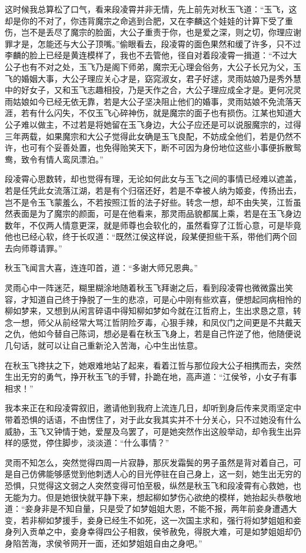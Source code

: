 这时候我总算松了口气，看来段凌霄并非无情，先上前先对秋玉飞道：“玉飞，这却是你的不对了，你违背魔宗之命逃到合肥，又在李麟这个娃娃的计算下受了重伤，岂不是丢尽了魔宗的脸面，大公子重责于你，也是爱之深，则之切，你理应谢罪才是，怎能还与大公子顶嘴。”偷眼看去，段凌霄的面色果然和缓了许多，只不过李麟的脸上已经是黄连模样了，我也不去管他，径自对着段凌霄一揖道：“不过大公子也有不对之处，玉飞乃是阁下师弟，魔宗无心理会俗务，大公子长兄为父，玉飞的婚姻大事，大公子理应关心才是，窈窕淑女，君子好逑，灵雨姑娘乃是秀外慧中的好女子，又和玉飞志趣相投，乃是天作之合，大公子理应成全才是。更何况灵雨姑娘如今已经无依无靠，若是大公子坚决阻止他们的婚事，灵雨姑娘不免流落天涯，若有什么闪失，不仅玉飞心碎神伤，就是魔宗的面子也有损伤。江某也知道大公子难以做主，不过若是将她留在玉飞身边，大公子应还是可以说服魔宗的，过得三年两载，如果魔宗和大公子觉得此女确是玉飞良配，不妨成全他们，若是仍然不许，也可有个妥善处置，也免得贻笑天下，断不可因为身份地位这些小事便拆散鸳鸯，致令有情人鸾凤漂泊。”

段凌霄心思数转，却也觉得有理，无论如何此女与玉飞之间的事情已经难以遮盖，若是任凭此女流落江湖，若是有个归宿还好，若是不幸被人纳为姬妾，传扬出去，岂不是令玉飞蒙羞么，不若按照江哲的法子好些。转念一想，却不由失笑，江哲虽然表面是为了魔宗的颜面，可是在他看来，那灵雨品貌都属上乘，若是在玉飞身边数年，不仅两人情意更深，就是师尊也会软化的，虽然看穿了江哲心意，可是毕竟他也已经心软，终于长叹道：“既然江侯这样说，段某便担些干系，带他们两个回去向师尊请罪。”

秋玉飞闻言大喜，连连叩首，道：“多谢大师兄恩典。”

灵雨心中一阵迷茫，糊里糊涂地随着秋玉飞拜谢之后，看到段凌霄也微微露出笑容，才知道自己终于挣脱了一生的悲凉，可是心中刚有些欢喜，便想起同病相怜的柳如梦来，又想到从闲言碎语中得知柳如梦如今就在江哲府上，生出求恳之意，转念一想，师父从前经常大骂江哲阴险歹毒，心狠手辣，和凤仪门之间更是不共戴天之仇，他如今替自己陈词，想必是看在秋玉飞身上，若是自己忤逆了他，他随便说几句话，就可以让自己重新沦入苦海，心中生出怯意。

在秋玉飞搀扶之下，她艰难地站了起来，看着江哲与那位段大公子相携而去，突然生出无穷的勇气，挣开秋玉飞的手臂，扑跪在地，高声道：“江侯爷，小女子有事相求！”

我本来正在和段凌霄叙旧，邀请他到我府上流连几日，却听到身后传来灵雨坚定中带着恐惧的话语，不由愣住了，对于此女我其实并不十分关心，只不过她没有什么威胁，玉飞又钟情于她，爱屋及乌罢了，可是她突然作出这般举动，却令我生出异样的感觉，停住脚步，淡淡道：“什么事情？”

灵雨不知怎么，突然觉得四周一片寂静，那灰发霜鬓的男子虽然是背对着自己，可是自己仿佛能够感觉到他刺透人心的目光停驻在自己身上，这一刻，她生出无穷的恐惧，只觉得这文弱之人突然变得可怕至极，纵然是秋玉飞和段凌霄有心救她，也无能为力。但是她很快就平静下来，想起柳如梦伤心欲绝的模样，她抬起头恭敬地道：“妾身非是不知自量，只是受了如梦姐姐大恩，不能不报，两年前妾身遭遇大变，若非柳如梦援手，妾身已经生不如死，这一次国主求和，强行将如梦姐姐和妾身列入贡单之中，妾身幸得四公子相救，侯爷赦免，得脱大难，可是如梦姐姐却仍身陷苦海，求侯爷网开一面，还如梦姐姐自由之身吧。”

